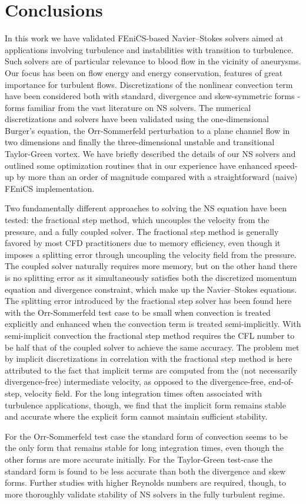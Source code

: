 \section{Conclusions}

In this work we have validated FEniCS-based Navier--Stokes solvers
aimed at applications involving turbulence and instabilities with
transition to turbulence. Such solvers are of particular relevance
to blood flow in the vicinity of aneurysms.
Our focus has been on flow energy and energy
conservation, features of great importance for turbulent
flows. Discretizations of the nonlinear convection term have been
considered both with standard, divergence and skew-symmetric forms -
forms familiar from the vast literature on NS solvers. The
numerical discretizations and solvers have been validated using the
one-dimensional Burger's equation, the Orr-Sommerfeld perturbation to
a plane channel flow in two dimensions and finally the
three-dimensional unstable and transitional Taylor-Green vortex. We
have briefly described the details of our NS solvers and outlined some
optimization routines that in our experience have enhanced speed-up by
more than an order of magnitude compared with a straightforward
(naive) FEniCS implementation.

Two fundamentally different approaches to solving the NS equation have
been tested: the fractional step method, which uncouples the velocity
from the pressure, and a fully coupled solver. The fractional step
method is generally favored by most CFD practitioners due to memory
efficiency, even though it imposes a splitting error through
uncoupling the velocity field from the pressure. The coupled solver
naturally requires more memory, but on the other hand there is no
splitting error as it simultaneously satisfies both the discretized
momentum equation and divergence constraint, which make up the
Navier--Stokes equations. The splitting error introduced by the
fractional step solver has been found here with the Orr-Sommerfeld
test case to be small when convection is treated explicitly and
enhanced when the convection term is treated semi-implicitly. With
semi-implicit convection the fractional step method requires the CFL
number to be half that of the coupled solver to achieve the same
accuracy. The problem met by implicit discretizations in correlation
with the fractional step method is here attributed to the fact that
implicit terms are computed from the (not necessarily divergence-free)
intermediate velocity, as opposed to the divergence-free, end-of-step,
velocity field. For the long integration times often associated with
turbulence applications, though, we find that the implicit form
remains stable and accurate where the explicit form cannot maintain
sufficient stability. 

For the Orr-Sommerfeld test case the standard form of convection seems
to be the only form that remains stable for long integration times,
even though the other forms are more accurate initially. For the
Taylor-Green test-case the standard form is found to be less accurate
than both the divergence and skew forms. Further studies with higher
Reynolds numbers are required, though, to more thoroughly validate
stability of NS solvers in the fully turbulent regime.
